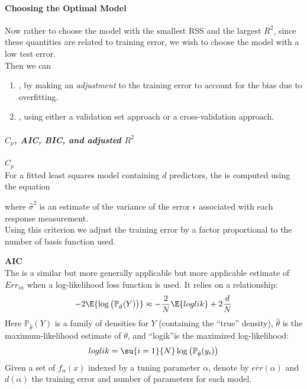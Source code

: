 \paragraph{Choosing the Optimal Model}
Now rather to choose the model with the smallest RSS and the largest
$R^{2}$, since these quantities are related to training error, we 
wish to choose the model with a low test error.\\
Then we can
\begin{enumerate}
	\item {}, by making an 
		\emph{adjustment} to the training error to account
		for the bias due to overfitting.
	\item {}, using either a 
		validation set approach or a cross-validation approach.
\end{enumerate}

\subparagraph{$C_{p}$, AIC, BIC, and adjusted $R^{2}$}
\textbf{$C_{p}$}\\
For a fitted least squares model containing $d$ predictors,
the  is computed using the equation
\begin{center}
\end{center}
where $\hat{\sigma}^{2}$ is an estimate of the variance of the error
$\epsilon$ associated with each response measurement.\\
Using this criterion we adjust the training error by a factor proportional to the number of basis
function used.

\textbf{AIC}\\
The  is a similar but more generally applicable but more
applicable estimate of $Err_{in}$ when a log-likelihood loss function is used. It relies on
a relationship:
$$ -2\E{\log\left(\mathbb{P}_{\hat{\theta}}(Y)\right)}\approx -\dfrac{2}{N}\E{loglik}+2\dfrac{d}{N}
$$ 
Here $\mathbb{P}_{\hat{\theta}}(Y)$ is a family of densities for $Y$ (containing the ``true''
density), $\hat{\theta}$ is the maximum-likelihood estimate of $\theta$, and ``logik''is the 
maximized log-likelihood:
$$ loglik = \su{{i=1}}{N}\log\left(\mathbb{P}_{\hat{\theta}}(y_{i})\right)$$
Given a set of $f_{\alpha}(x)$ indexed by a tuning parameter $\alpha$, denote by $\overline{err}(
\alpha)$ and $d(\alpha)$ the training error and number of parameters for each model.
\begin{center}
\end{center}

